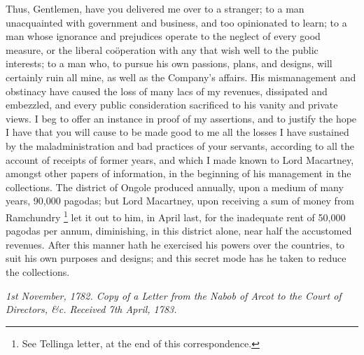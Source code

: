 Thus, Gentlemen, have you delivered me over to a stranger; to a man unacquainted with government and business, and too opinionated to learn; to a man whose ignorance and prejudices operate to the neglect of every good measure, or the liberal coöperation with any that wish well to the public interests; to a man who, to pursue his own passions, plans, and designs, will certainly ruin all mine, as well as the Company's affairs. His mismanagement and obstinacy have caused the loss of many lacs of my revenues, dissipated and embezzled, and every public consideration sacrificed to his vanity and private views. I beg to offer an instance in proof of my assertions, and to justify the hope I have that you will cause to be made good to me all the losses I have sustained by the maladministration and bad practices of your servants, according to all the account of receipts of former years, and which I made known to Lord Macartney, amongst other papers of information, in the beginning of his management in the collections. The district of Ongole produced annually, upon a medium of many years, 90,000 pagodas; but Lord Macartney, upon receiving a sum of money from Ramchundry
\footnote{ See Tellinga letter, at the end of this correspondence.}
 let it out to him, in April last, for the inadequate rent of 50,000 pagodas per annum, diminishing, in this district alone, near half the accustomed revenues. After this manner hath he exercised his powers over the countries, to suit his own purposes and designs; and this secret mode has he taken to reduce the collections.

\PRLsep

\textit{1st November, 1782. Copy of a Letter from the Nabob of Arcot to the Court of Directors, \&c. Received 7th April, 1783.}
\vspace{0.3cm}

